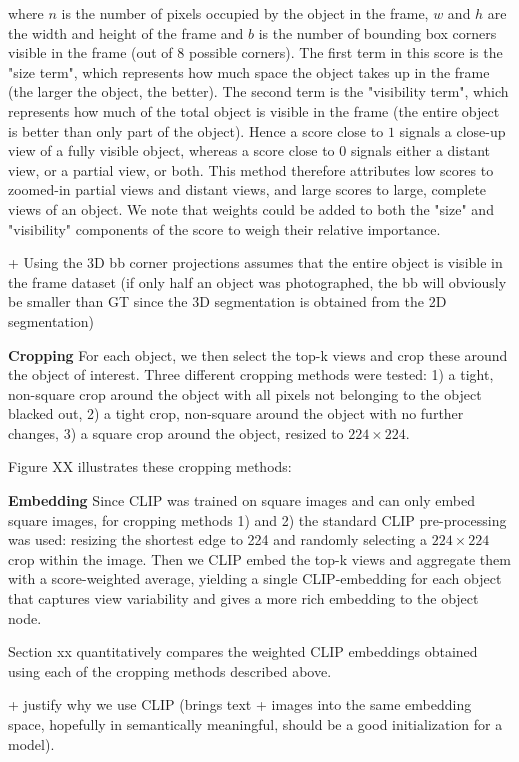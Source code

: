 where $n$ is the number of pixels occupied by the object in the frame, $w$ and $h$ are the width and height of the frame and $b$ is the number of bounding box corners visible in the frame (out of 8 possible corners). The first term in this score is the "size term", which represents how much space the object takes up in the frame (the larger the object, the better). The second term is the "visibility term", which represents how much of the total object is visible in the frame (the entire object is better than only part of the object). Hence a score close to $1$ signals a close-up view of a fully visible object, whereas a score close to $0$ signals either a distant view, or a partial view, or both. This method therefore attributes low scores to zoomed-in partial views and distant views, and large scores to large, complete views of an object. We note that weights could be added to both the "size" and "visibility" components of the score to weigh their relative importance.

+ Using the 3D bb corner projections assumes that the entire object is visible in the frame dataset (if only half an object was photographed, the bb will obviously be smaller than GT since the 3D segmentation is obtained from the 2D segmentation)

\bigskip
\noindent
\textbf{Cropping}
For each object, we then select the top-k views and crop these around the object of interest. Three different cropping methods were tested: 1) a tight, non-square crop around the object with all pixels not belonging to the object blacked out, 2) a tight crop, non-square around the object with no further changes, 3) a square crop around the object, resized to $224 \times 224$.

Figure XX illustrates these cropping methods:

\bigskip
\noindent
\textbf{Embedding}
Since CLIP was trained on square images and can only embed square images, for cropping methods 1) and 2) the standard CLIP pre-processing was used: resizing the shortest edge to 224 and randomly selecting a $224 \times 224$ crop within the image. Then we CLIP embed the top-k views and aggregate them with a score-weighted average, yielding a single CLIP-embedding for each object that captures view variability and gives a more rich embedding to the object node.

Section xx quantitatively compares the weighted CLIP embeddings obtained using each of the cropping methods described above.

+ justify why we use CLIP (brings text + images into the same embedding space, hopefully in semantically meaningful, should be a good initialization for a model).

